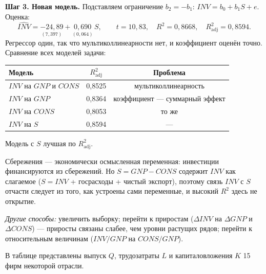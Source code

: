 \begin{solution}
\smallskip
\textbf{Шаг 3. Новая модель.} Подставляем ограничение $b_2 = -b_1$:
$\mathit{INV} = b_0 + b_1S + e$. Оценка:
\[
  \widehat{\mathit{INV}} = \underset{(7{,}397)}{-24{,}89}
                         + \underset{(0{,}064)}{0{,}690}\,S,
  \qquad t = 10{,}83,\quad R^2 = 0{,}8668,\quad R^2_{\text{adj}} = 0{,}8594 .
\]
Регрессор один, так что мультиколлинеарности нет, и коэффициент оценён точно.
Сравнение всех моделей задачи:
\begin{center}
\begin{tabular}{lcc}
\toprule
Модель & $R^2_{\text{adj}}$ & Проблема \\
\midrule
$\mathit{INV}$ на $\mathit{GNP}$ и $\mathit{CONS}$ & 0,8525 & мультиколлинеарность \\
$\mathit{INV}$ на $\mathit{GNP}$                  & 0,8364 & коэффициент — суммарный эффект \\
$\mathit{INV}$ на $\mathit{CONS}$                 & 0,8053 & то же \\
$\mathit{INV}$ на $S$                             & 0,8594 & — \\
\bottomrule
\end{tabular}
\end{center}
Модель с $S$ лучшая по $R^2_{\text{adj}}$.

\begin{remark}
Сбережения — экономически осмысленная переменная: инвестиции финансируются
из сбережений. Но $S = \mathit{GNP} - \mathit{CONS}$ содержит $\mathit{INV}$
как слагаемое ($S = \mathit{INV}$ + госрасходы + чистый экспорт), поэтому
связь $\mathit{INV}$ с $S$ отчасти следует из того, как устроены сами
переменные, и высокий $R^2$ здесь не открытие.
\end{remark}

\medskip
\emph{Другие способы:} увеличить выборку; перейти к приростам
($\Delta\mathit{INV}$ на $\Delta\mathit{GNP}$ и $\Delta\mathit{CONS}$) —
приросты связаны слабее, чем уровни растущих рядов; перейти к относительным
величинам ($\mathit{INV}/\mathit{GNP}$ на $\mathit{CONS}/\mathit{GNP}$).
\end{solution}

\ifsolutions\clearpage\fi
{}

В таблице представлены выпуск $Q$, трудозатраты $L$ и капиталовложения $K$
15 фирм некоторой отрасли.

